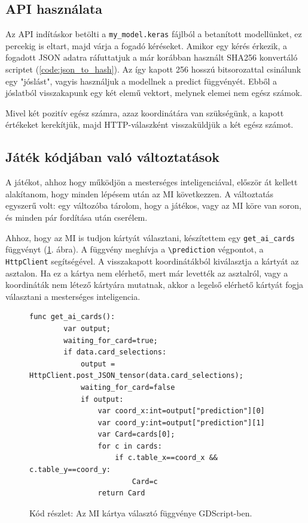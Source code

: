 \subsection{API használata}

Az API indításkor betölti a \lstinline{my_model.keras} fájlból a betanított modellünket, ez percekig is eltart, majd várja a fogadó kéréseket. 
Amikor egy kérés érkezik, a fogadott JSON adatra ráfuttatjuk a már korábban használt SHA256 konvertáló scriptet (\ref{code:json_to_hash}).
Az így kapott 256 hosszú bitsorozattal csinálunk egy "jóslást", vagyis használjuk a modellnek a predict függvényét. Ebből a jóslatból visszakapunk egy két elemű vektort, melynek elemei nem egész számok.

Mivel két pozitív egész számra, azaz koordinátára van szükségünk, a kapott értékeket kerekítjük, majd HTTP-válaszként visszaküldjük a két egész számot.
\subsection{Játék kódjában való változtatások}

A játékot, ahhoz hogy működjön a mesterséges inteligenciával, először át kellett alakítanom, hogy minden lépésem után az MI következzen. A változtatás egyszerű volt: egy változóba tárolom, hogy a játékos, vagy az MI köre van soron, és minden pár fordítása után cserélem. 

Ahhoz, hogy az MI is tudjon kártyát választani, készítettem egy \lstinline{get_ai_cards} függvényt (\ref{code:get_ai_card}. ábra). A függvény meghívja a \lstinline{\prediction} végpontot, a \lstinline{HttpClient} segítségével.
A visszakapott koordinátákból kiválasztja a kártyát az asztalon. 
Ha ez a kártya nem elérhető, mert már levették az asztalról, vagy a koordináták nem létező kártyára mutatnak, akkor a legelső elérhető kártyát fogja választani a mesterséges inteligencia. 

\begin{figure}[H]
    \centering
    \begin{lstlisting}[language=GDScript]
func get_ai_cards():
        var output;
        waiting_for_card=true;
        if data.card_selections:
            output = HttpClient.post_JSON_tensor(data.card_selections);
            waiting_for_card=false
            if output:
                var coord_x:int=output["prediction"][0]
                var coord_y:int=output["prediction"][1]
                var Card=cards[0];
                for c in cards:
                    if c.table_x==coord_x && c.table_y==coord_y:
                        Card=c
                return Card
    \end{lstlisting}
    \caption{Kód részlet: Az MI kártya választó függvénye GDScript-ben.}
    \label{code:get_ai_card}
\end{figure}
